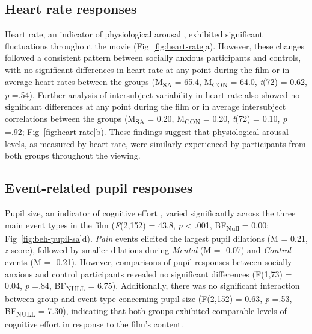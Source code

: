 \subsection{Heart rate responses}
Heart rate, an indicator of physiological arousal \citep{wascher2021}, exhibited significant fluctuations throughout the movie (Fig~\ref{fig:heart-rate}a). However, these changes followed a consistent pattern between socially anxious participants and controls, with no significant differences in heart rate at any point during the film or in average heart rates between the groups (M\textsubscript{SA} = 65.4, M\textsubscript{CON} = 64.0, \textit{t}(72) = 0.62, \textit{p} =.54). Further analysis of intersubject variability in heart rate also showed no significant differences at any point during the film or in average intersubject correlations between the groups (M\textsubscript{SA} = 0.20, M\textsubscript{CON} = 0.20, \textit{t}(72) = 0.10, \textit{p} =.92; Fig~\ref{fig:heart-rate}b). These findings suggest that physiological arousal levels, as measured by heart rate, were similarly experienced by participants from both groups throughout the viewing.

\subsection{Event-related pupil responses}
Pupil size, an indicator of cognitive effort \citep{beatty1982,burlingham2022}, varied significantly across the three main event types in the film (\textit{F}(2,152) = 43.8, \textit{p} < .001, BF\textsubscript{Null} = 0.00; Fig~\ref{fig:beh-pupil-sa}d). \textit{Pain} events elicited the largest pupil dilations (M = 0.21, \textit{z}-score), followed by smaller dilations during \textit{Mental} (M = -0.07) and \textit{Control} events (M = -0.21). However, comparisons of pupil responses between socially anxious and control participants revealed no significant differences (F(1,73) = 0.04, \textit{p} =.84, BF\textsubscript{NULL} = 6.75). Additionally, there was no significant interaction between group and event type concerning pupil size (F(2,152) = 0.63, \textit{p} =.53, BF\textsubscript{NULL} = 7.30), indicating that both groups exhibited comparable levels of cognitive effort in response to the film's content.

